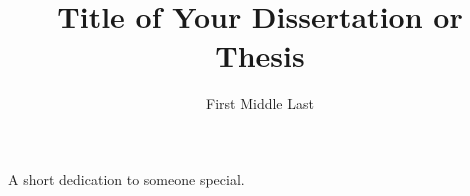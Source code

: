 \documentclass[12pt]{report}
\author{First Middle Last}                        %
\title{Title of Your Dissertation or Thesis}      %
\begin{document}

\copyrightpage

\commcertpage
\titlepage


\begin{dedication} %
A short dedication to someone special.
\end{dedication}

\begin{acknowledgments} %

\end{acknowledgments}

\utabstract %
\indent



\tableofcontents
\listoftables
\listoffigures









\appendices     %









\printindex

\begin{vita} %
\noindent

\end{vita}
\end{document}
